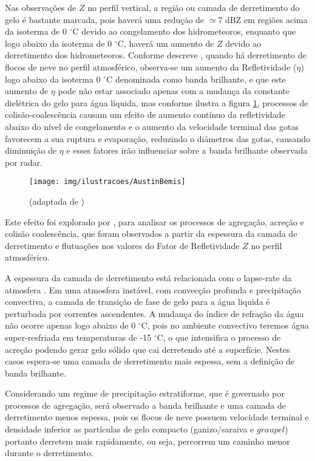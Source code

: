Nas observações de $Z$ no perfil vertical, a região ou camada de derretimento do gelo é bastante marcada, pois haverá uma redução de $\simeq$7 dBZ em regiões acima da isoterma de 0 $^{\circ}$C devido ao congelamento dos hidrometeoros, enquanto que logo abaixo da isoterma de 0 $^{\circ}$C, haverá um aumento de $Z$ devido ao derretimento dos hidrometeoros. Conforme descreve , quando há derretimento de flocos de neve no perfil atmosférico, observa-se um aumento da Refletividade ($\eta$) logo abaixo da isoterma 0 $^{\circ}$C denominada como banda brilhante, e que este aumento de $\eta$ pode não estar associado apenas com a mudança da constante dielétrica do gelo para água líquida, mas conforme ilustra a figura \ref{Austin},  processos de colisão-coalescência causam um efeito de aumento contínuo da refletividade abaixo do nível de congelamento e o aumento da velocidade terminal das gotas favorecem a sua ruptura e evaporação, reduzindo o diâmetros das gotas, causando diminuição de $\eta$ e esses fatores irão influenciar sobre a banda brilhante observada por radar.

\begin{figure}[hb]
\centering
\texttt{[image: img/ilustracoes/AustinBemis]}
\caption{(adaptada de )}
\label{Austin}
\end{figure}


Este efeito foi explorado por , para analisar os processos  de  agregação, acreção e colisão coalescência, que foram observados a partir da espessura da camada de derretimento e flutuações nos valores do Fator de Refletividade $Z$ no perfil atmosférico. 

A espessura da camada de derretimento está relacionada com o lapse-rate da atmosfera \cite[p.~462]{austin1950,mason1971_2ed}. Em uma atmosfera instável, com convecção profunda e precipitação convectiva, a camada de transição de fase de gelo para a água liquida é perturbada por correntes ascendentes. A mudança do índice de refração da água não ocorre apenas logo abaixo de 0 $^{\circ}$C, pois no ambiente convectivo teremos água super-resfriada em temperaturas de -15 $^{\circ}$C, o que intensifica o processo de acreção podendo gerar gelo sólido que cai derretendo até a superfície. Nestes casos espera-se uma camada de derretimento mais espessa, sem a definição de banda brilhante.

Considerando um regime de precipitação estratiforme, que é governado por processos de agregação, será observado a banda brilhante e uma camada de derretimento menos espessa, pois os flocos de neve possuem velocidade terminal e densidade inferior  as partículas de gelo compacto (ganizo/saraiva e $graupel$) portanto derretem mais rapidamente, ou seja, percorrem um caminho menor durante o derretimento. 

